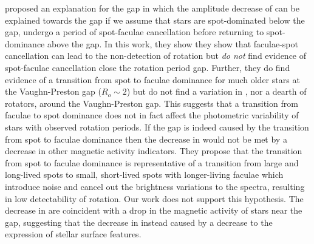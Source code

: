 \citet{reinhold_spot_2018} proposed an explanation for the gap in which the amplitude decrease of \rper{} can be explained towards the gap if we assume that stars are spot-dominated below the gap, undergo a period of spot-faculae cancellation before returning to spot-dominance above the gap.
In this work, they show they show that faculae-spot cancellation can lead to the non-detection of rotation but \textit{do not} find evidence of spot-faculae cancellation close the rotation period gap.
Further, they do find evidence of a transition from spot to faculae dominance for much older stars at the Vaughn-Preston gap ($R_o \sim 2$) but do not find a variation in \rper{}, nor a dearth of rotators, around the Vaughn-Preston gap.
This suggests that a transition from faculae to spot dominance does not in fact affect the photometric variability of stars with observed rotation periods.
If the gap is indeed caused by the transition from spot to faculae dominance then the decrease in \rper{} would not be met by a decrease in other magnetic activity indicators.
They propose that the transition from spot to faculae dominance is representative of a transition from large and long-lived spots to small, short-lived spots with longer-living faculae which introduce noise and cancel out the brightness variations to the spectra, resulting in low detectability of rotation.
Our work does not support this hypothesis.
The decrease in \rper{} are coincident with a drop in the magnetic activity of stars near the gap, suggesting that the decrease in \rper{} instead caused by a decrease to the expression of stellar surface features. 

